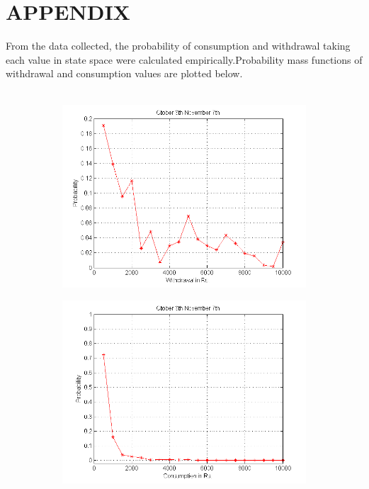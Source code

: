 \documentclass[12pt]{article}
\begin{document}
\section{APPENDIX}
From the data collected, the probability of consumption and withdrawal taking each value in state space were calculated empirically.Probability mass functions of withdrawal and consumption values are plotted below.
\\\\
\begin{figure}[H]
\centering
\begin{subfigure}
  \centering
  \includegraphics[width=.43\linewidth]{WOCT.png}
\end{subfigure}
\begin{subfigure}
  \centering
  \includegraphics[width=.43\linewidth]{COCT.png}
\end{subfigure}
\label{fig:test}
\end{figure}
\end{document}
